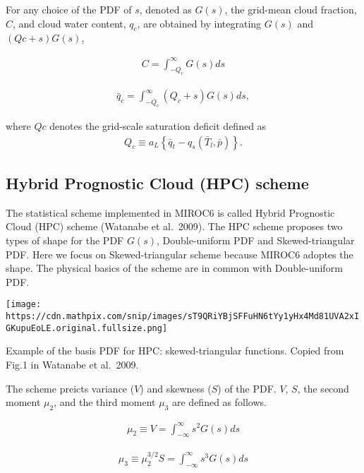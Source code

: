 For any choice of the PDF of \(s\), denoted as \(G(s)\), the grid-mean
cloud fraction, \(C\), and cloud water content, \(q_c\), are obtained by
integrating \(G(s)\) and \((Qc + s)G(s)\),

\begin{eqnarray}
C=\int_{-Q_{c}}^{\infty} G(s) d s
\end{eqnarray}

\begin{eqnarray}
\bar{q}_{c}=\int_{-Q_{c}}^{\infty}\left(Q_{c}+s\right) G(s) ds,
\end{eqnarray}

where \(Qc\) denotes the grid-scale saturation deficit defined as \begin{eqnarray}
Q_{c} \equiv a_{L}\left\{\bar{q}_{t}-q_{s}\left(\bar{T}_{l}, \bar{p}\right)\right\}.
\end{eqnarray}

\hypertarget{hybrid-prognostic-cloud-hpc-scheme}{%
\subsection{Hybrid Prognostic Cloud (HPC)
scheme}\label{hybrid-prognostic-cloud-hpc-scheme}}

The statistical scheme implemented in MIROC6 is called Hybrid Prognostic
Cloud (HPC) scheme (Watanabe et al.~2009). The HPC scheme proposes two
types of shape for the PDF \(G(s)\), Double-uniform PDF and
Skewed-triangular PDF. Here we focus on Skewed-triangular scheme because
MIROC6 adoptes the shape. The physical basics of the scheme are in
common with Double-uniform PDF.

\texttt{[image: https://cdn.mathpix.com/snip/images/sT9QRiYBjSFFuHN6tYy1yHx4Md81UVA2xIGKupuEoLE.original.fullsize.png]}

Example of the basis PDF for HPC: skewed-triangular functions. Copied
from Fig.1 in Watanabe et al.~2009.

The scheme preicts variance (\(V\)) and skewness (\(S\)) of the PDF.
\(V\), \(S\), the second moment \(\mu_2\), and the third moment
\(\mu_3\) are defined as follows.

\begin{eqnarray}
\mu_{2} \equiv V=\int_{-\infty}^{\infty} s^{2} G(s) d s
\end{eqnarray}

\begin{eqnarray}
\mu_{3} \equiv \mu_{2}^{3 / 2} S=\int_{-\infty}^{\infty} s^{3} G(s) d s
\end{eqnarray}

